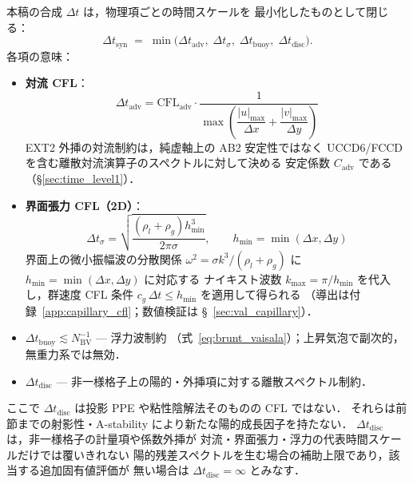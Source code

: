 本稿の合成 $\Delta t$ は，物理項ごとの時間スケールを
最小化したものとして閉じる：
\begin{equation}
  \Delta t_{\mathrm{syn}}
  \;=\; \min\!\bigl(\Delta t_{\mathrm{adv}},\;
                    \Delta t_\sigma,\;
                    \Delta t_{\mathrm{buoy}},\;
                    \Delta t_{\mathrm{disc}}\bigr).
  \label{eq:dt_per_term}
\end{equation}
各項の意味：
\begin{itemize}[leftmargin=2em]
  \item \textbf{対流 CFL}：
        \begin{equation}
          \Delta t_{\mathrm{adv}}
          = \mathrm{CFL}_{\mathrm{adv}}\cdot
            \frac{1}{\max\!\left(\dfrac{|u|_{\max}}{\Delta x}+\dfrac{|v|_{\max}}{\Delta y}\right)}
          \label{eq:dt_adv}
        \end{equation}
        EXT2 外挿の対流制約は，純虚軸上の AB2 安定性ではなく
        UCCD6/FCCD を含む離散対流演算子のスペクトルに対して決める
        安定係数 $C_{\mathrm{adv}}$ である（\S\ref{sec:time_level1}）．
  \item \textbf{界面張力 CFL（2D）}：
        \begin{equation}
          \Delta t_\sigma
          = \sqrt{\frac{(\rho_l + \rho_g)h_{\min}^3}{2\pi\sigma}},
          \qquad h_{\min}=\min(\Delta x,\Delta y)
          \label{eq:dt_sigma}
        \end{equation}
        界面上の微小振幅波の分散関係 $\omega^2 = \sigma k^3/(\rho_l+\rho_g)$ に
        $h_{\min}=\min(\Delta x,\Delta y)$ に対応する
        ナイキスト波数 $k_{\max}=\pi/h_{\min}$ を代入し，群速度 CFL 条件
        $c_g\,\Delta t \le h_{\min}$ を適用して得られる
        （導出は付録~\ref{app:capillary_cfl}；数値検証は \S~\ref{sec:val_capillary}）．
  \item $\Delta t_{\mathrm{buoy}} \lesssim N_{\mathrm{BV}}^{-1}$ — 浮力波制約
        （式~\eqref{eq:brunt_vaisala}）；上昇気泡で副次的，無重力系では無効．
  \item $\Delta t_{\mathrm{disc}}$ — 非一様格子上の陽的・外挿項に対する離散スペクトル制約．
\end{itemize}
ここで $\Delta t_{\mathrm{disc}}$ は投影 PPE や粘性陰解法そのものの CFL ではない．
それらは前節までの射影性・A-stability により新たな陽的成長因子を持たない．
$\Delta t_{\mathrm{disc}}$ は，非一様格子の計量項や係数外挿が
対流・界面張力・浮力の代表時間スケールだけでは覆いきれない
陽的残差スペクトルを生む場合の補助上限であり，該当する追加固有値評価が
無い場合は $\Delta t_{\mathrm{disc}}=\infty$ とみなす．

